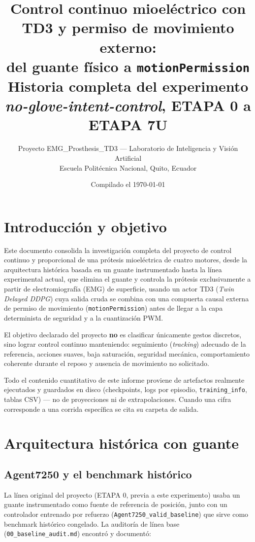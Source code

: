 \documentclass[11pt,a4paper]{article}
\title{Control continuo mioeléctrico con TD3 y permiso de movimiento externo:\\
del guante físico a \texttt{motionPermission}\\
\large Historia completa del experimento \emph{no-glove-intent-control}, ETAPA 0 a ETAPA 7U}
\author{Proyecto EMG\_Prosthesis\_TD3 --- Laboratorio de Inteligencia y Visión Artificial\\
Escuela Politécnica Nacional, Quito, Ecuador}
\date{Compilado el \today}
\begin{document}
\maketitle
\tableofcontents
\newpage

\section{Introducción y objetivo}

Este documento consolida la investigación completa del proyecto de control continuo y
proporcional de una prótesis mioeléctrica de cuatro motores, desde la arquitectura
histórica basada en un guante instrumentado hasta la línea experimental actual,
que elimina el guante y controla la prótesis exclusivamente a partir de electromiografía
(EMG) de superficie, usando un actor TD3 (\emph{Twin Delayed DDPG}) cuya salida cruda
se combina con una compuerta causal externa de permiso de movimiento
(\texttt{motionPermission}) antes de llegar a la capa determinista de seguridad y a la
cuantización PWM.

El objetivo declarado del proyecto \textbf{no} es clasificar únicamente gestos
discretos, sino lograr control continuo manteniendo: seguimiento (\emph{tracking})
adecuado de la referencia, acciones suaves, baja saturación, seguridad mecánica,
comportamiento coherente durante el reposo y ausencia de movimiento no solicitado.

Todo el contenido cuantitativo de este informe proviene de artefactos realmente
ejecutados y guardados en disco (checkpoints, logs por episodio, \texttt{training\_info},
tablas CSV) --- no de proyecciones ni de extrapolaciones. Cuando una cifra corresponde a
una corrida específica se cita su carpeta de salida.

\section{Arquitectura histórica con guante}

\subsection{Agent7250 y el benchmark histórico}

La línea original del proyecto (ETAPA 0, previa a este experimento) usaba un guante
instrumentado como fuente de referencia de posición, junto con un controlador
entrenado por refuerzo (\texttt{Agent7250\_valid\_baseline}) que sirve como benchmark
histórico congelado. La auditoría de línea base (\texttt{00\_baseline\_audit.md})
encontró y documentó:
\end{document}
